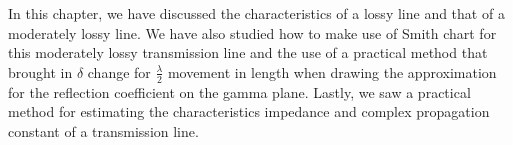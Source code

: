 In this chapter, we have discussed the characteristics of a lossy line and that of a moderately lossy line. We have also studied how to make use of Smith chart for this moderately lossy transmission line and the use of a practical method that brought in $\delta$ change for $\frac{\lambda}{2}$ movement in length when drawing the approximation for the reflection coefficient on the gamma plane. Lastly, we saw a practical method for estimating the characteristics impedance and complex propagation constant of a transmission line.
